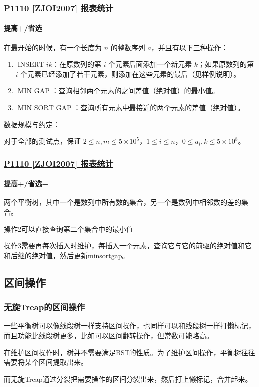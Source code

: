 \documentclass[utf8]{ctexbeamer}
\begin{document}
    \begin{frame}
        \frametitle{\href{https://www.luogu.com.cn/problem/P1110}{P1110 [ZJOI2007] 报表统计}}
        \framesubtitle{\textcolor[RGB]{52, 152, 219}{提高+/省选−}}        
        在最开始的时候，有一个长度为 $n$ 的整数序列 $a$，并且有以下三种操作：
        
        \begin{enumerate}
            \item $\operatorname{INSERT} i k$：在原数列的第 $i$ 个元素后面添加一个新元素 $k$；如果原数列的第 $i$ 个元素已经添加了若干元素，则添加在这些元素的最后（见样例说明）。
            \item $\operatorname{MIN\_GAP}$：查询相邻两个元素的之间差值（绝对值）的最小值。
            \item $\operatorname{MIN\_SORT\_GAP}$：查询所有元素中最接近的两个元素的差值（绝对值）。
        \end{enumerate}
        数据规模与约定：

        对于全部的测试点，保证 $2 \le n, m \le 5\times10^5$，$1 \leq i \leq n$，$0 \leq a_i, k \leq 5 \times 10^8$。
    \end{frame}

    \begin{frame}
        \frametitle{\href{https://www.luogu.com.cn/problem/P1110}{P1110 [ZJOI2007] 报表统计}}
        \framesubtitle{\textcolor[RGB]{52, 152, 219}{提高+/省选−}}   

        两个平衡树，其中一个是数列中所有数的集合，另一个是数列中相邻数的差的集合。

        操作2可以直接查询第二个集合中的最小值

        操作3需要再每次插入时维护，每插入一个元素，查询它与它的前驱的绝对值和它和后继的绝对值，然后更新minsortgap。
    \end{frame}

    \subsection{区间操作}

    \begin{frame}
        \frametitle{无旋Treap的区间操作}
        一些平衡树可以像线段树一样支持区间操作，也同样可以和线段树一样打懒标记，而且功能比线段树更多，比如可以区间翻转操作，但常数可能略高。

        在维护区间操作时，树并不需要满足BST的性质。为了维护区间操作，平衡树往往需要将某个区间提取出来。

        而无旋Treap通过分裂把需要操作的区间分裂出来，然后打上懒标记，合并起来。
    \end{frame}
\end{document}
